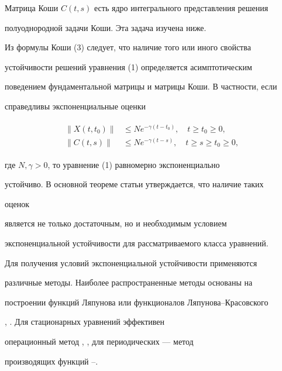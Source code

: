 %


Матрица Коши $C(t,s)$ есть ядро интегрального представления решения


полуоднородной задачи Коши. Эта задача изучена ниже.





Из формулы Коши (3) следует, что наличие того или иного свойства


устойчивости решений уравнения (1) определяется асимптотическим


поведением фундаментальной матрицы и матрицы Коши. В частности, если


справедливы экспоненциальные оценки


%


\begin{align}


\begin{split}


\|X(t,t_0)\| &\le Ne^{-\gamma(t-t_0)}, \quad t\ge t_0\ge0,\\


%


\|C(t,s)\| &\le Ne^{-\gamma(t-s)}, \quad t\ge s\ge t_0\ge0,


\end{split}


\end{align}


%


где $N,\gamma>0$, то уравнение (1) равномерно экспоненциально


устойчиво. В основной теореме статьи утверждается, что наличие таких


оценок


является не только достаточным, но и необходимым условием


экспоненциальной устойчивости для рассматриваемого класса уравнений.





Для получения условий экспоненциальной устойчивости применяются


различные методы. Наиболее распространенные методы основаны на


построении функций Ляпунова или функционалов Ляпунова--Красовского


\cite{Hale}, \cite{Kol}. Для стационарных уравнений эффективен


операционный метод \cite{Hale}, \cite{Kol}, для периодических --- метод


производящих функций \cite{Ber}--\cite{Si4}.





